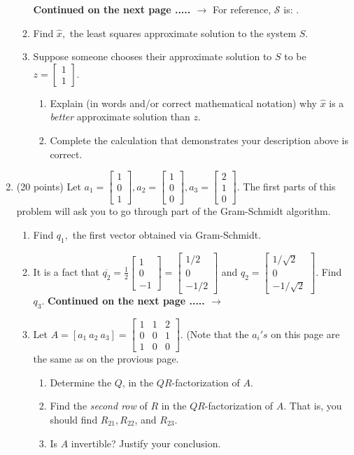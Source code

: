 \documentclass[11pt,fleqn]{article}
\def\vectwo#1#2{\begin{bmatrix}#1\\#2\end{bmatrix}}
\def\vecthree#1#2#3{\begin{bmatrix}#1\\#2\\#3\end{bmatrix}}
\begin{document}
\begin{enumerate}
\begin{enumerate}
	\quad \hfill \textbf{Continued on the next page ..... $\longrightarrow$}
	\newpage
	For reference,  $\mathcal{S}$ is: \quad {}.
	\item Find $\hat{x},$ the least squares approximate solution to the system $S.$
	\vfill
	\item Suppose someone chooses their approximate solution to $S$ to be $z=\vectwo{1}{1}.$
		\begin{enumerate}
		\item Explain (in words and/or correct mathematical notation) why $\hat{x}$ is a \emph{better} approximate solution than $z.$
		\vfill
		\item Complete the calculation that demonstrates your description above is correct.
		\vfill
		\end{enumerate}
	\vfill
	\end{enumerate}
\newpage
\item (20 points) Let $a_1=\vecthree{1}{0}{1}, a_2=\vecthree{1}{0}{0}, a_3=\vecthree{2}{1}{0}.$ The first parts of this problem will ask you to go through part of the Gram-Schmidt algorithm.  
	\begin{enumerate}
	\item Find $q_1,$ the first vector obtained via Gram-Schmidt.
	\vspace{1in}
	\item It is a fact that\:  {\Large{$\overline{q_2}= \frac{1}{2}\vecthree{1}{0}{-1}=\vecthree{1/2}{0}{-1/2}$}} and {\Large{$q_2=\vecthree{1/\sqrt{2}}{0}{-1/\sqrt{2}}.$}} Find $q_3.$
	\vfill
	\quad \hfill \textbf{Continued on the next page ..... $\longrightarrow$}
	\newpage
	\item Let $A=[a_1 \: a_2 \: a_3]=\begin{bmatrix} 1&1&2\\0&0&1\\1&0&0 \end{bmatrix}.$ (Note that the $a_i's$ on this page are the same as on the provious page. 
		\begin{enumerate}	
		\item Determine the $Q$, in the $QR$-factorization of $A.$
		\vfill
		\item Find the \emph{second row} of $R$ in the $QR$-factorization of $A$. That is, you should find $R_{21}, R_{22}$, and $R_{23}$.
		\vfill
		\item Is $A$ invertible? Justify your conclusion.
		\vspace{1in}
		\end{enumerate}
	\end{enumerate}
\newpage


\end{enumerate}
\end{document}
